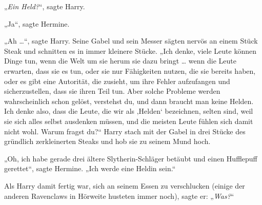 „\emph{Ein Held?}“, sagte Harry.

„Ja“, sagte Hermine.

„Ah …“, sagte Harry. Seine Gabel und sein Messer sägten nervös an einem Stück Steak und schnitten es in immer kleinere Stücke.
„Ich denke, viele Leute können Dinge tun, wenn die Welt um sie herum sie dazu bringt … wenn die Leute erwarten, dass sie es tun, oder sie nur Fähigkeiten nutzen, die sie bereits haben, oder es gibt eine Autorität, die zusieht, um ihre Fehler aufzufangen und sicherzustellen, dass sie ihren Teil tun. Aber solche Probleme werden wahrscheinlich schon gelöst, verstehst du, und dann braucht man keine Helden. Ich denke also, dass die Leute, die wir als ‚Helden‘ bezeichnen, selten sind, weil sie sich alles selbst ausdenken müssen, und die meisten Leute fühlen sich damit nicht wohl. Warum fragst du?“ Harry stach mit der Gabel in drei Stücke des gründlich zerkleinerten Steaks und hob sie zu seinem Mund hoch.

„Oh, ich habe gerade drei ältere Slytherin-Schläger betäubt und einen Hufflepuff gerettet“, sagte Hermine.
„Ich werde eine Heldin sein.“

Als Harry damit fertig war, sich an seinem Essen zu verschlucken (einige der anderen Ravenclaws in Hörweite husteten immer noch), sagte er:
„\emph{Was?}“

